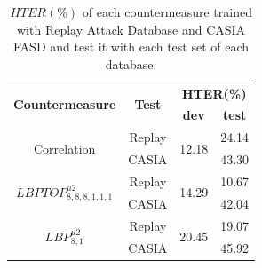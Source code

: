 

\begin{table}[ht]
\caption{$HTER(\%)$  of each countermeasure trained with Replay Attack Database and CASIA FASD and test it with each test set of each database.}
\begin{center}
  \begin{tabular}{ | c | c | c  c |}
    \hline

   \multirow{2}{*}{\textbf{Countermeasure}} &  \multirow{2}{*}{\textbf{Test}} & \multicolumn{2}{c|}{\textbf{HTER(\%)}} \\ 
    &&\textbf{dev} & \textbf{test}  \\ \hline
    
    \multirow{2}{*}{Correlation} & Replay  &  \multirow{2}{*}{12.18} & 24.14 \\ 
               & CASIA &  & 43.30  \\ \hline \hline

    \multirow{2}{*}{$LBPTOP_{8,8,8,1,1,1}^{u2}$}  & Replay  & \multirow{2}{*}{14.29} & 10.67 \\
               &  CASIA  & & 42.04  \\ \hline \hline

    \multirow{2}{*}{$LBP_{8,1}^{u2}$}  & Replay  & \multirow{2}{*}{20.45} &19.07 \\
                & CASIA  &  & 45.92 \\
    \hline
  \end{tabular}
\end{center}
\label{tb:TrainAllTest}
\end{table}


